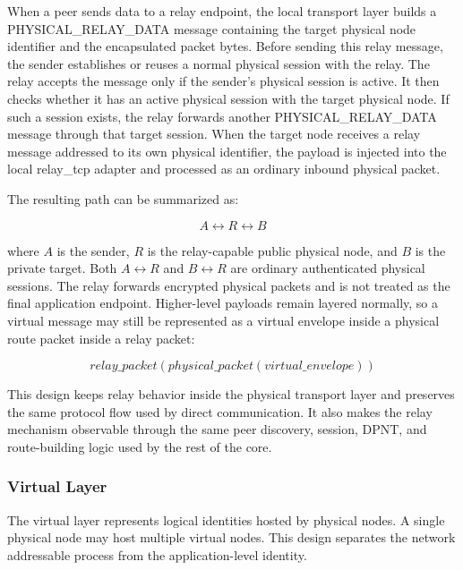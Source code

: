\documentclass[12pt,a4paper]{article}
\newcommand{\codebreak}[1]{{\footnotesize\ttfamily #1}}
\begin{document}
When a peer sends data to a relay endpoint, the local transport layer builds a \codebreak{PHYSICAL\_\allowbreak{}RELAY\_\allowbreak{}DATA} message containing the target physical node identifier and the encapsulated packet bytes. Before sending this relay message, the sender establishes or reuses a normal physical session with the relay. The relay accepts the message only if the sender's physical session is active. It then checks whether it has an active physical session with the target physical node. If such a session exists, the relay forwards another \codebreak{PHYSICAL\_\allowbreak{}RELAY\_\allowbreak{}DATA} message through that target session. When the target node receives a relay message addressed to its own physical identifier, the payload is injected into the local \codebreak{relay\_\allowbreak{}tcp} adapter and processed as an ordinary inbound physical packet.

The resulting path can be summarized as:

\begin{equation}
    A \leftrightarrow R \leftrightarrow B
\end{equation}

where \(A\) is the sender, \(R\) is the relay-capable public physical node, and \(B\) is the private target. Both \(A \leftrightarrow R\) and \(B \leftrightarrow R\) are ordinary authenticated physical sessions. The relay forwards encrypted physical packets and is not treated as the final application endpoint. Higher-level payloads remain layered normally, so a virtual message may still be represented as a virtual envelope inside a physical route packet inside a relay packet:

\begin{equation}
    relay\_packet(physical\_packet(virtual\_envelope))
\end{equation}

This design keeps relay behavior inside the physical transport layer and preserves the same protocol flow used by direct communication. It also makes the relay mechanism observable through the same peer discovery, session, DPNT, and route-building logic used by the rest of the core.

\subsubsection{Virtual Layer}
\label{subsec:virtual-layer-implementation}

The virtual layer represents logical identities hosted by physical nodes. A single physical node may host multiple virtual nodes. This design separates the network addressable process from the application-level identity.
\end{document}
